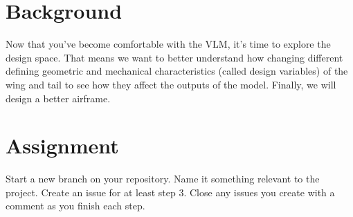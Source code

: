 \documentclass[12pt]{article}
\begin{document}
	

\section{Background}

Now that you've become comfortable with the VLM, it's time to explore the design space.
That means we want to better understand how changing different defining geometric and mechanical characteristics (called design variables) of the wing and tail to see how they affect the outputs of the model. 
Finally, we will design a better airframe. 



\section{Assignment}
Start a new branch on your repository. Name it something relevant to the project. Create an issue for at least step 3. Close any issues you create with a comment as you finish each step. 
\end{document}
